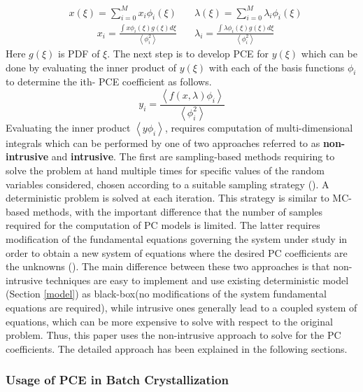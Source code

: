 \documentclass[3p,times,authoryear]{elsarticle}
\begin{document}
\begin{align}
&x(\xi) = \sum_{i=0}^{M} x_{i}\phi_{i}(\xi) 
\quad
&\lambda(\xi) = \sum_{i=0}^{M} \lambda_{i}\phi_{i}(\xi)
\end{align}
\begin{align} \label{orthogonal}
&x_{i} = \frac{\int x\phi_{i}(\xi)g(\xi) d\xi}{\left\langle \phi^{2}_{i}\right\rangle } \quad
&\lambda_{i} = \frac{\int \lambda\phi_{i}(\xi)g(\xi) d\xi}{\left\langle \phi^{2}_{i}\right\rangle }
\end{align}
Here $g(\xi)$ is PDF of $\xi$. The next step is to develop PCE for $y(\xi)$ which can be done by evaluating the inner product of $y(\xi)$ with each of the basis functions $\phi_{i}$ to determine the ith- PCE coefficient as follows.
\begin{equation}
y_{i} = \frac{\left\langle f(x,\lambda)\phi_{i} \right\rangle }{\left\langle \phi^{2}_{i} \right\rangle }
\end{equation}
Evaluating the inner product $\left\langle y\phi_{i} \right\rangle $, requires computation of multi-dimensional integrals which can be performed by one of two approaches referred to as \textbf{non-intrusive} and \textbf{intrusive}. The first are sampling-based methods requiring to
solve the problem at hand multiple times for specific values of the random variables considered,
chosen according to a suitable sampling strategy (\cite{xiu2010}). A deterministic problem is
solved at each iteration. This strategy is similar to MC-based methods, with the
important difference that the number of samples required for the computation of PC models is
limited. The latter requires modification of the fundamental equations governing the system under
study in order to obtain a new system of equations where the desired PC coefficients are the unknowns (\cite{eldred2009recent}). The main difference between these two
approaches is that non-intrusive techniques are easy to implement and use existing deterministic model (Section \ref{model}) as black-box(no modifications of the system fundamental equations are required), while intrusive ones generally lead to a coupled system of equations, which can be more expensive to solve with respect to the original problem. Thus, this paper uses the non-intrusive approach to solve for the PC coefficients. The detailed approach has been explained in the following sections.
\subsubsection{Usage of PCE in Batch Crystallization}
\end{document}

